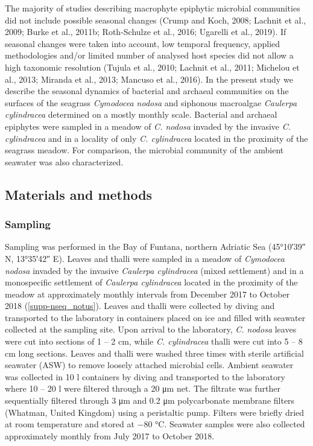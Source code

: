 \documentclass[
  12pt,
]{article}
\begin{document}
The majority of studies describing macrophyte epiphytic microbial
communities did not include possible seasonal changes (Crump and Koch,
2008; Lachnit et al., 2009; Burke et al., 2011b; Roth-Schulze et al.,
2016; Ugarelli et al., 2019). If seasonal changes were taken into
account, low temporal frequency, applied methodologies and/or limited
number of analysed host species did not allow a high taxonomic
resolution (Tujula et al., 2010; Lachnit et al., 2011; Michelou et al.,
2013; Miranda et al., 2013; Mancuso et al., 2016). In the present study
we describe the seasonal dynamics of bacterial and archaeal communities
on the surfaces of the seagrass \emph{Cymodocea nodosa} and siphonous
macroalgae \emph{Caulerpa cylindracea} determined on a mostly monthly
scale. Bacterial and archaeal epiphytes were sampled in a meadow of
\emph{C. nodosa} invaded by the invasive \emph{C. cylindracea} and in a
locality of only \emph{C. cylindracea} located in the proximity of the
seagrass meadow. For comparison, the microbial community of the ambient
seawater was also characterized.

\newpage

\hypertarget{materials-and-methods}{%
\subsection{Materials and methods}\label{materials-and-methods}}

\hypertarget{sampling}{%
\subsubsection{Sampling}\label{sampling}}

Sampling was performed in the Bay of Funtana, northern Adriatic Sea
(\ang{45;10;39} N, \ang{13;35;42} E). Leaves and thalli were sampled in
a meadow of \emph{Cymodocea nodosa} invaded by the invasive
\emph{Caulerpa cylindracea} (mixed settlement) and in a monospecific
settlement of \emph{Caulerpa cylindracea} located in the proximity of
the meadow at approximately monthly intervals from December 2017 to
October 2018 (\autoref{supp-nseq_notus}). Leaves and thalli were
collected by diving and transported to the laboratory in containers
placed on ice and filled with seawater collected at the sampling site.
Upon arrival to the laboratory, \emph{C. nodosa} leaves were cut into
sections of 1 -- 2 \si{\cm}, while \emph{C. cylindracea} thalli were cut
into 5 -- 8 \si{\cm} long sections. Leaves and thalli were washed three
times with sterile artificial seawater (ASW) to remove loosely attached
microbial cells. Ambient seawater was collected in 10 \si{\l} containers
by diving and transported to the laboratory where 10 -- 20 \si{\l} were
filtered through a 20 \si{\um} net. The filtrate was further
sequentially filtered through 3 \si{\um} and 0.2 \si{\um} polycarbonate
membrane filters (Whatman, United Kingdom) using a peristaltic pump.
Filters were briefly dried at room temperature and stored at \num{-80}
\si{\degreeCelsius}. Seawater samples were also collected approximately
monthly from July 2017 to October 2018.
\end{document}
